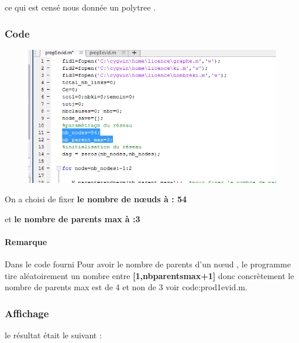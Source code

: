 \documentclass[12pt,a4paper,oneside]{book}
\begin{document}
	ce qui est censé nous donnée un polytree .
	\subsubsection{Code}
	
    	\begin{figure}[h]
		\centering
		\includegraphics[scale=0.7]{screens/prodevid1code.png}
		\label{labelname}%
		\end{figure}
	
	On a choisi de fixer \textbf{le nombre de nœuds à : 54}
	
	et \textbf{le nombre de parents max à :3 }
	
   \paragraph{Remarque}
   Dans le code fourni Pour avoir le nombre de parents d'un nœud , le programme tire aléatoirement un nombre entre \textbf{[1,nbparentsmax+1]} donc concrètement  le nombre de parents max est de 4 et non de 3  voir code:prod1evid.m.
   
	\subsubsection{Affichage}
	le résultat était le suivant :
	
\end{document}
